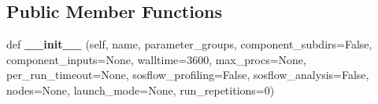 \subsection*{Public Member Functions}
\begin{DoxyCompactItemize}
\item 
\mbox{\label{classcodar_1_1cheetah_1_1parameters_1_1_sweep_group_ac736891b570edfa88bd8391ac82232c0}} 
def {\bfseries \+\_\+\+\_\+init\+\_\+\+\_\+} (self, name, parameter\+\_\+groups, component\+\_\+subdirs=False, component\+\_\+inputs=None, walltime=3600, max\+\_\+procs=None, per\+\_\+run\+\_\+timeout=None, sosflow\+\_\+profiling=False, sosflow\+\_\+analysis=False, nodes=None, launch\+\_\+mode=None, run\+\_\+repetitions=0)
\end{DoxyCompactItemize}
